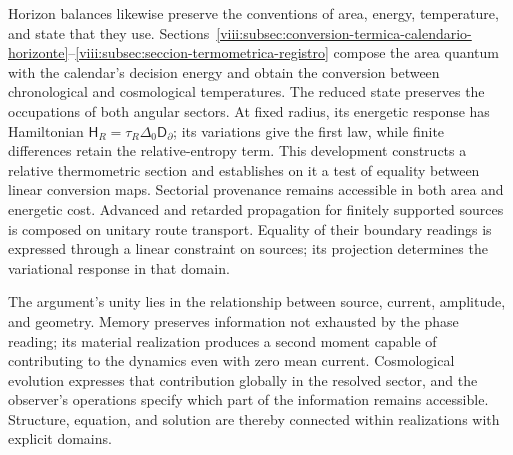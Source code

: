Horizon balances likewise preserve the conventions of
area, energy, temperature, and state that they use.
Sections~\ref{viii:subsec:conversion-termica-calendario-horizonte}--\ref{viii:subsec:seccion-termometrica-registro}
compose the area quantum with the calendar's decision energy and obtain
the conversion between chronological and cosmological temperatures.
The reduced state preserves the occupations of both angular sectors.
At fixed radius, its energetic response has Hamiltonian
\(\mathsf H_R=\tau_R\Delta_0\mathsf D_\partial\); its variations
give the first law, while finite differences retain the relative-entropy
term. This development constructs a relative thermometric section and
establishes on it a test of equality between linear conversion maps.
Sectorial provenance remains accessible in both area and energetic cost.
Advanced and retarded propagation for finitely supported sources is
composed on unitary route transport. Equality of their boundary readings is
expressed through a linear constraint on sources; its projection
determines the variational response in that domain.

The argument's unity lies in the relationship between source, current,
amplitude, and geometry. Memory preserves information not exhausted by
the phase reading; its material realization produces a second moment
capable of contributing to the dynamics even with zero mean current.
Cosmological evolution expresses that contribution globally in the
resolved sector, and the observer's operations specify which part of the
information remains accessible. Structure, equation, and solution are
thereby connected within realizations with explicit domains.
